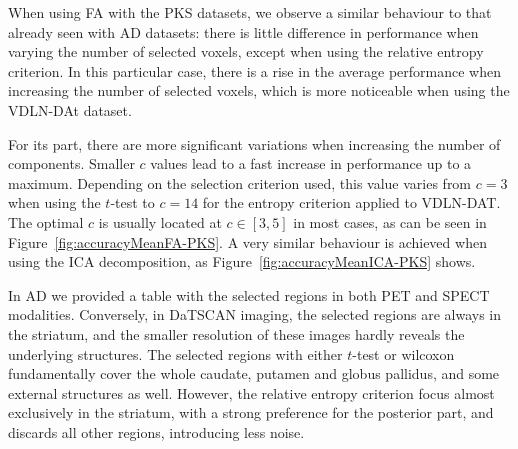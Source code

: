When using \ac{FA} with the \ac{PKS} datasets, we observe a similar behaviour to that already seen with \ac{AD} datasets: there is little difference in performance when varying the number of selected voxels, except when using the relative entropy criterion. In this particular case, there is a rise in the average performance when increasing the number of selected voxels, which is more noticeable when using the VDLN-DAt dataset. 

For its part, there are more significant variations when increasing the number of components. Smaller $c$ values lead to a fast increase in performance up to a maximum. Depending on the selection criterion used, this value varies from $c=3$ when using the $t$-test to $c=14$ for the entropy criterion applied to VDLN-DAT. The optimal $c$ is usually located at $c\in [3,5]$ in most cases, as can be seen in Figure~\ref{fig:accuracyMeanFA-PKS}. A very similar behaviour is achieved when using the \ac{ICA} decomposition, as Figure~\ref{fig:accuracyMeanICA-PKS} shows.

In \ac{AD} we provided a table with the selected regions in both \ac{PET} and \ac{SPECT} modalities. Conversely, in DaTSCAN imaging, the selected regions are always in the striatum, and the smaller resolution of these images hardly reveals the underlying structures. The selected regions with either $t$-test or wilcoxon fundamentally cover the whole caudate, putamen and globus pallidus, and some external structures as well. However, the relative entropy criterion focus almost exclusively in the striatum, with a strong preference for the posterior part, and discards all other regions, introducing less noise. 

